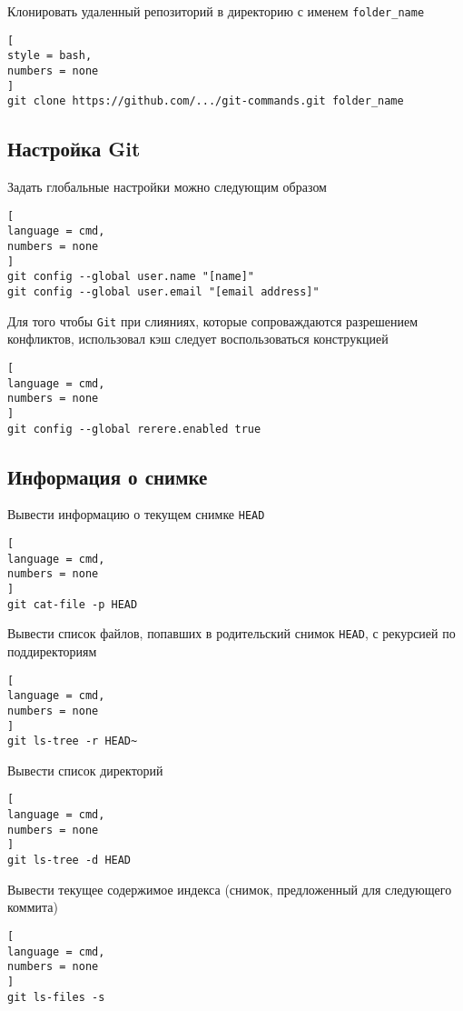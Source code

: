 \documentclass[%
	11pt,
	a4paper,
	utf8,
		]{article}
\begin{document}
Клонировать удаленный репозиторий в директорию с именем \texttt{folder\_name}
\begin{lstlisting}[
style = bash,
numbers = none
]
git clone https://github.com/.../git-commands.git folder_name
\end{lstlisting}


\subsection{Настройка Git}

Задать глобальные настройки можно следующим образом

\begin{lstlisting}[
language = cmd,
numbers = none
]
git config --global user.name "[name]"
git config --global user.email "[email address]"
\end{lstlisting}

Для того чтобы \texttt{Git} при слияниях, которые сопроваждаются разрешением конфликтов, использовал кэш следует воспользоваться конструкцией

\begin{lstlisting}[
language = cmd,
numbers = none
]
git config --global rerere.enabled true
\end{lstlisting}

\subsection{Информация о снимке}

Вывести информацию о текущем снимке \texttt{HEAD}
\begin{lstlisting}[
language = cmd,
numbers = none
]
git cat-file -p HEAD
\end{lstlisting}

Вывести список файлов, попавших в родительский снимок \texttt{HEAD}, с рекурсией по поддиректориям
\begin{lstlisting}[
language = cmd,
numbers = none
]
git ls-tree -r HEAD~
\end{lstlisting}

Вывести список директорий
\begin{lstlisting}[
language = cmd,
numbers = none
]
git ls-tree -d HEAD
\end{lstlisting}

Вывести текущее содержимое индекса (снимок, предложенный для следующего коммита)
\begin{lstlisting}[
language = cmd,
numbers = none
]
git ls-files -s
\end{lstlisting}
\end{document}
